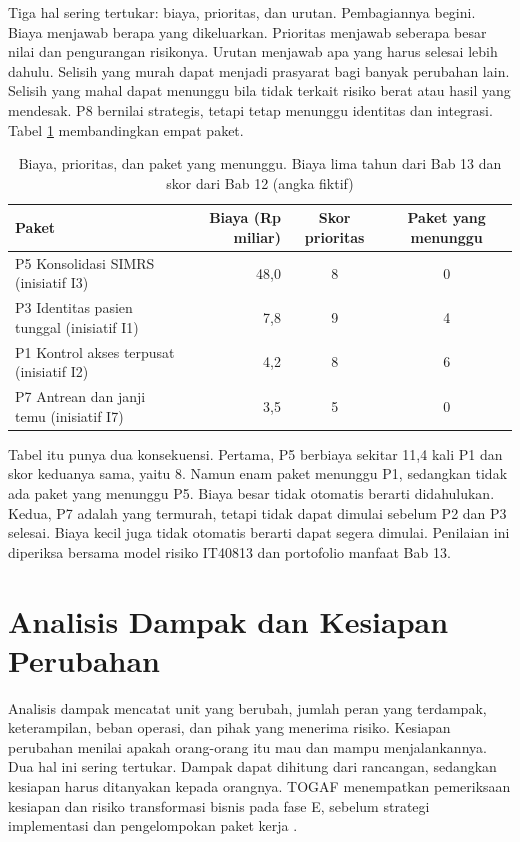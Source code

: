 Tiga hal sering tertukar: biaya, prioritas, dan urutan. Pembagiannya begini. Biaya menjawab berapa yang dikeluarkan.
Prioritas menjawab seberapa besar nilai dan pengurangan risikonya. Urutan menjawab apa yang harus selesai lebih dahulu.
Selisih yang murah dapat menjadi prasyarat bagi banyak perubahan lain. Selisih yang mahal dapat menunggu bila tidak terkait
risiko berat atau hasil yang mendesak. P8 bernilai strategis, tetapi tetap menunggu identitas dan integrasi. Tabel
\ref{tab:ch11-biaya-prioritas} membandingkan empat paket.

\begin{table}[!htb]
  \centering
  \caption{Biaya, prioritas, dan paket yang menunggu. Biaya lima tahun dari Bab 13 dan skor dari Bab 12 (angka fiktif)}
  \label{tab:ch11-biaya-prioritas}
  \small
  \begin{tabularx}{\textwidth}{>{\raggedright\arraybackslash}Xrcc}
    \hline
    \textbf{Paket} & \textbf{Biaya (Rp miliar)} & \textbf{Skor prioritas} & \textbf{Paket yang menunggu} \\ \hline
    P5 Konsolidasi SIMRS (inisiatif I3) & 48,0 & 8 & 0 \\ \hline
    P3 Identitas pasien tunggal (inisiatif I1) & 7,8 & 9 & 4 \\ \hline
    P1 Kontrol akses terpusat (inisiatif I2) & 4,2 & 8 & 6 \\ \hline
    P7 Antrean dan janji temu (inisiatif I7) & 3,5 & 5 & 0 \\ \hline
  \end{tabularx}
\end{table}

Tabel itu punya dua konsekuensi. Pertama, P5 berbiaya sekitar 11,4 kali P1 dan skor keduanya sama, yaitu 8. Namun enam paket
menunggu P1, sedangkan tidak ada paket yang menunggu P5. Biaya besar tidak otomatis berarti didahulukan. Kedua, P7 adalah yang
termurah, tetapi tidak dapat dimulai sebelum P2 dan P3 selesai. Biaya kecil juga tidak otomatis berarti dapat segera dimulai.
Penilaian ini diperiksa bersama model risiko IT40813 dan portofolio manfaat Bab 13.

\section{Analisis Dampak dan Kesiapan Perubahan}

Analisis dampak mencatat unit yang berubah, jumlah peran yang terdampak, keterampilan, beban operasi, dan pihak yang menerima
risiko. Kesiapan perubahan menilai apakah orang-orang itu mau dan mampu menjalankannya. Dua hal ini sering tertukar. Dampak dapat
dihitung dari rancangan, sedangkan kesiapan harus ditanyakan kepada orangnya. TOGAF menempatkan pemeriksaan kesiapan dan risiko
transformasi bisnis pada fase E, sebelum strategi implementasi dan pengelompokan paket kerja \cite{c11-togaf-fasee}.

